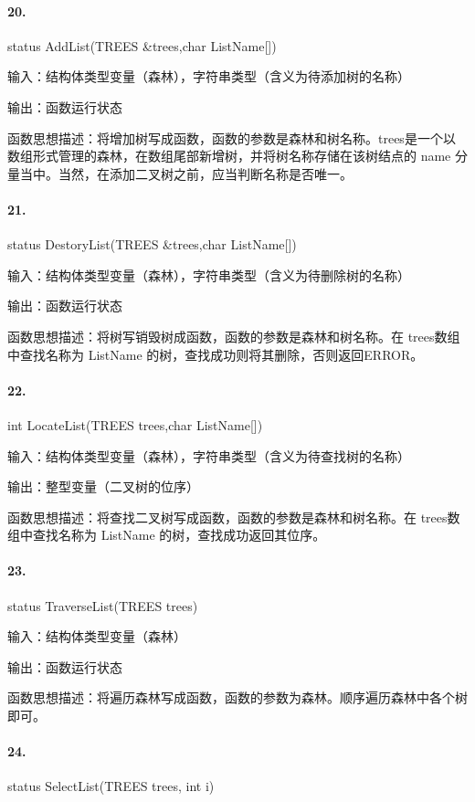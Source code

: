 \documentclass[supercite]{Experimental_Report}
\theoremstyle{definition}
\begin{document}
\paragraph{20.}status AddList(TREES \&trees,char ListName[])

输入：结构体类型变量（森林），字符串类型（含义为待添加树的名称）

输出：函数运行状态

函数思想描述：将增加树写成函数，函数的参数是森林和树名称。trees是一个以数组形式管理的森林，在数组尾部新增树，并将树名称存储在该树结点的 name 分量当中。当然，在添加二叉树之前，应当判断名称是否唯一。

\paragraph{21.}status DestoryList(TREES \&trees,char ListName[])

输入：结构体类型变量（森林），字符串类型（含义为待删除树的名称）

输出：函数运行状态

函数思想描述：将树写销毁树成函数，函数的参数是森林和树名称。在 trees数组中查找名称为 ListName 的树，查找成功则将其删除，否则返回ERROR。

\paragraph{22.}int LocateList(TREES trees,char ListName[])

输入：结构体类型变量（森林），字符串类型（含义为待查找树的名称）

输出：整型变量（二叉树的位序）

函数思想描述：将查找二叉树写成函数，函数的参数是森林和树名称。在 trees数组中查找名称为 ListName 的树，查找成功返回其位序。

\paragraph{23.}status TraverseList(TREES trees)

输入：结构体类型变量（森林）

输出：函数运行状态

函数思想描述：将遍历森林写成函数，函数的参数为森林。顺序遍历森林中各个树即可。

\paragraph{24.}status SelectList(TREES trees, int i)
\end{document}
